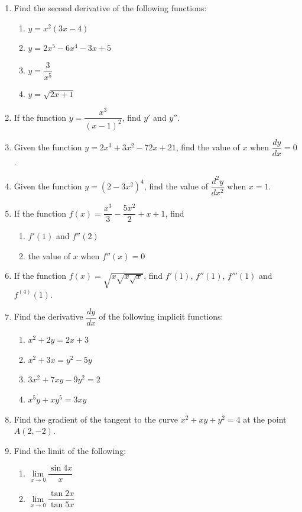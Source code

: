 \documentclass[12pt]{report}
\begin{document}
\begin{enumerate}
  \item Find the second derivative of the following functions:
        \begin{enumerate}
          \item $y=x^{2}(3x-4)$
          \item $y=2x^{5}-6x^{4}-3x+5$
          \item $y={\dfrac{3}{x^{5}}}$
          \item $y={\sqrt{2x+1}}$
        \end{enumerate}

  \item If the function $y = \dfrac{x^3}{(x-1)^2}$, find $y'$ and $y''$.
  \item Given the function $y = 2x^3 + 3x^2 - 72x + 21$, find the value of $x$ when
        $\dfrac{dy}{dx} = 0$.
  \item Given the function $y = (2-3x^2)^4$, find the value of $\dfrac{d^2y}{dx^2}$
        when $x = 1$.
  \item If the function $f(x) = \dfrac{x^3}{3} - \dfrac{5x^2}{2} + x + 1$, find
        \begin{enumerate}
          \item $f'(1)$ and $f''(2)$
          \item the value of $x$ when $f''(x) = 0$
        \end{enumerate}
  \item If the function $f(x) = \sqrt{x\sqrt{x\sqrt{x}}}$, find $f'(1)$, $f''(1)$,
        $f'''(1)$ and $f^{(4)}(1)$.
  \item Find the derivative $\dfrac{dy}{dx}$ of the following implicit functions:
        \begin{enumerate}
          \item $x^{2}+2y=2x+3$
          \item $x^{2}+3x=y^{2}-5y$
          \item $3x^{2}+7x y-9y^{2}=2$
          \item $x^{5}y+x y^{5}=3x y$
        \end{enumerate}
  \item Find the gradient of the tangent to the curve $x^2 + xy + y^2 = 4$ at the point
        $A(2, -2)$.
  \item Find the limit of the following:
        \begin{enumerate}
          \item $\lim\limits_{x\to0}{\dfrac{\sin{4x}}{x}}$
          \item $\lim\limits_{x\to0}{\dfrac{\tan2x}{\tan5x}}$

\end{enumerate}
\end{enumerate}
\end{document}
